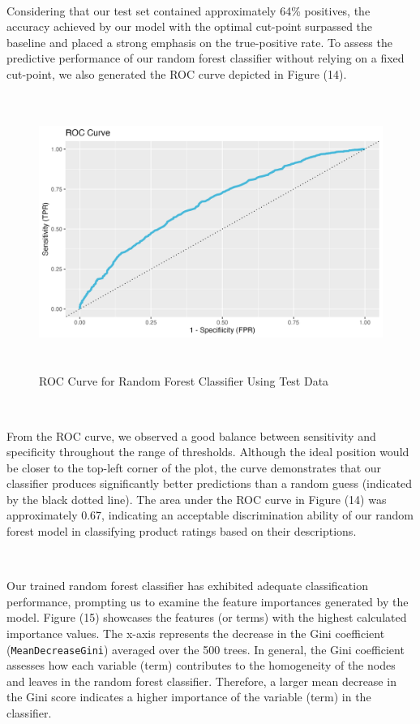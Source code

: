 \documentclass[10pt]{article}
\begin{document}
\

Considering that our test set contained approximately 64\% positives, the accuracy achieved by our model with the optimal cut-point surpassed the baseline and placed a strong emphasis on the true-positive rate. To assess the predictive performance of our random forest classifier without relying on a fixed cut-point, we also generated the ROC curve depicted in Figure (14).

\begin{figure}[ht!]
    \centering
    \hspace*{-2em}
    \includegraphics[height=90mm, width=120mm]{desc_results_roc.png}
    \caption{ROC Curve for Random Forest Classifier Using Test Data}
\end{figure}


\

From the ROC curve, we observed a good balance between sensitivity and specificity throughout the range of thresholds. Although the ideal position would be closer to the top-left corner of the plot, the curve demonstrates that our classifier produces significantly better predictions than a random guess (indicated by the black dotted line). The area under the ROC curve in Figure (14) was approximately 0.67, indicating an acceptable discrimination ability of our random forest model in classifying product ratings based on their descriptions.

\


Our trained random forest classifier has exhibited adequate classification performance, prompting us to examine the feature importances generated by the model. Figure (15) showcases the features (or terms) with the highest calculated importance values. The x-axis represents the decrease in the Gini coefficient (\texttt{MeanDecreaseGini}) averaged over the 500 trees. In general, the Gini coefficient assesses how each variable (term) contributes to the homogeneity of the nodes and leaves in the random forest classifier. Therefore, a larger mean decrease in the Gini score indicates a higher importance of the variable (term) in the classifier.
\end{document}
